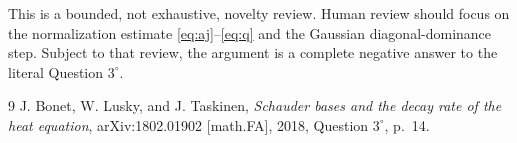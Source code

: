 \documentclass[11pt]{article}
\begin{document}
This is a bounded, not exhaustive, novelty review.  Human review should focus
on the normalization estimate \eqref{eq:aj}--\eqref{eq:q} and the Gaussian
diagonal-dominance step.  Subject to that review, the argument is a complete
negative answer to the literal Question $3^\circ$.

\begin{thebibliography}{9}
J. Bonet, W. Lusky, and J. Taskinen,
\emph{Schauder bases and the decay rate of the heat equation},
arXiv:1802.01902 [math.FA], 2018, Question $3^\circ$, p.~14.
\end{thebibliography}
\end{document}
